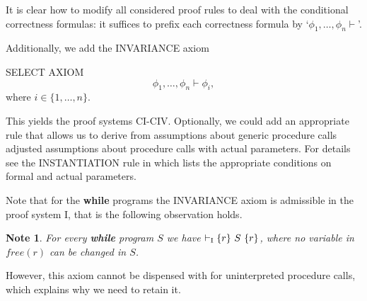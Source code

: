 \documentclass[manuscript, screen, review]{acmart}
\newtheorem{note}{Note}  %
\begin{document}
It is clear how to modify all considered proof rules to deal with the
conditional correctness formulas: it suffices to prefix each
correctness formula by `$\phi_1, \dots, \phi_n \vdash$'.  







Additionally, we add the INVARIANCE axiom
\III

\NI
SELECT AXIOM
\[
\phi_1, \dots, \phi_n \vdash \phi_i,
\]
where $i \in \{1, \dots, n\}$.
\III

This yields the proof systems CI-CIV.
Optionally, we could add an appropriate rule that allows us to
derive from assumptions about generic procedure calls adjusted
assumptions about procedure calls with actual parameters.  For details
see the INSTANTIATION rule in \cite[page 159]{ABO09} which lists the
appropriate conditions on formal and actual parameters.

Note that for the \textbf{while} programs the INVARIANCE axiom is admissible in the proof system I, that is the following
observation holds.

\begin{note} \label{note:1}
  For every \textbf{while} program $S$ we have
  $\vdash_{\mathrm{I}} \mbox{$\{{r}\}\ {S}\ \{{r}\}$}$, where no variable in
  $\mathit{free}(r)$ can be changed in $S$.

\end{note}

However, this axiom cannot be dispensed with for uninterpreted procedure calls, which explains why we
need to retain it.
\end{document}
